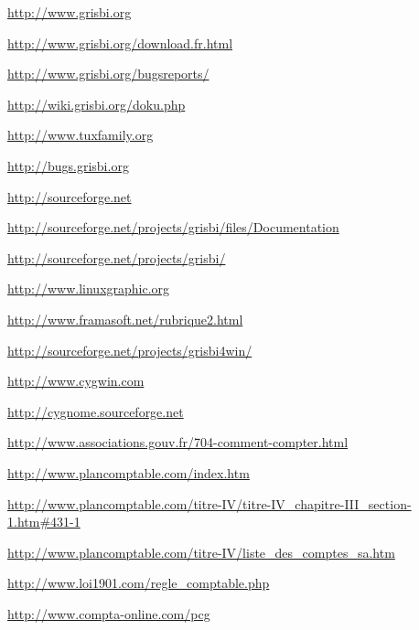 

\urldef{\urlGrisbi}%
\url{http://www.grisbi.org}

\urldef{\urlGrisbiTelechargement}%
\url{http://www.grisbi.org/download.fr.html}

\urldef{\urlBugTracker}%
\url{http://www.grisbi.org/bugsreports/}

\urldef{\urlGrisbiWiki}%
\url{http://wiki.grisbi.org/doku.php}

\urldef{\urlTuxFamily}%
\url{http://www.tuxfamily.org}

\urldef{\urlTuxFamilyMantis}%
\url{http://bugs.grisbi.org}

\urldef{\urlSourceForge}%
\url{http://sourceforge.net}

\urldef{\urlSourceForgeDocumentation}%
\url{http://sourceforge.net/projects/grisbi/files/Documentation}

\urldef{\urlGitGrisbi}%
\url{http://sourceforge.net/projects/grisbi/}

\urldef{\urlLinuxGraphic}%
\url{http://www.linuxgraphic.org}

\urldef{\urlFramasoftLogiciels}%
\url{http://www.framasoft.net/rubrique2.html}

\urldef{\urlGrisbiWin}%
\url{http://sourceforge.net/projects/grisbi4win/}

\urldef{\urlCygWin}%
\url{http://www.cygwin.com}

\urldef{\urlCyGnome}%
\url{http://cygnome.sourceforge.net}

\urldef{\urlAssociationsGouv}%
\url{http://www.associations.gouv.fr/704-comment-compter.html}

\urldef{\urlPlanComptable}%
\url{http://www.plancomptable.com/index.htm}

\urldef{\urlPlanDeComptes}%
\url{http://www.plancomptable.com/titre-IV/titre-IV_chapitre-III_section-1.htm#431-1}

\urldef{\urlListeComptes}%
\url{http://www.plancomptable.com/titre-IV/liste_des_comptes_sa.htm}

\urldef{\urlMaisonAssociations}%
\url{http://www.loi1901.com/regle_comptable.php}

\urldef{\urlComptaOnLine}%
\url{http://www.compta-online.com/pcg}

